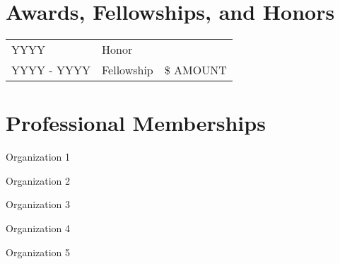 \documentclass[11pt]{article}
\newcommand{\RR}{\raggedright\arraybackslash} %
\newcommand{\RL}{\raggedleft\arraybackslash}  %
\begin{document}
\section*{Awards, Fellowships, and Honors}
\begin{tabularx}{\linewidth}{>{\RR}p{1in}>{\RR}X>{\RL}p{.85in}}
YYYY & Honor \\
YYYY - YYYY & Fellowship & \$ AMOUNT \\ %

\end{tabularx}



\section*{Professional Memberships}

\hspace{-.25em}\begin{itemize*}[itemjoin={{ $\bullet$}}, label={}]
\item Organization 1
\item Organization 2
\item Organization 3
\item Organization 4
\item Organization 5
\end{itemize*}



\end{document}
